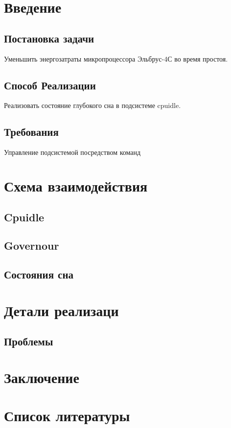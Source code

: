 \documentclass{article}
\begin{document}


\tableofcontents

\newpage

\section{Введение}

\subsection{Постановка задачи}
Уменьшить энергозатраты микропроцессора Эльбрус-4С во время простоя.

\subsection{Способ Реализации}
Реализовать состояние глубокого сна в подсистеме cpuidle.

\subsection{Требования}
Управление подсистемой посредством команд

\newpage
\section{Схема взаимодействия}

\subsection{Cpuidle}


\subsection{Governour}

\subsection{Состояния сна}

\newpage
\section{Детали реализаци}

\subsection{}

\subsection{Проблемы}

\newpage
\section{Заключение}

\newpage
\section{Список литературы}
\end{document}
